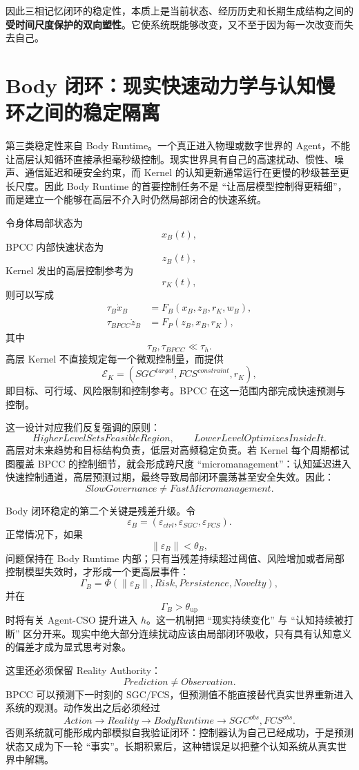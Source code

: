 因此三相记忆闭环的稳定性，本质上是当前状态、经历历史和长期生成结构之间的\textbf{受时间尺度保护的双向塑性}。它使系统既能够改变，又不至于因为每一次改变而失去自己。

\section{Body 闭环：现实快速动力学与认知慢环之间的稳定隔离}

第三类稳定性来自 Body Runtime。一个真正进入物理或数字世界的 Agent，不能让高层认知循环直接承担毫秒级控制。现实世界具有自己的高速扰动、惯性、噪声、通信延迟和硬安全约束，而 Kernel 的认知更新通常运行在更慢的秒级甚至更长尺度。因此 Body Runtime 的首要控制任务不是 ``让高层模型控制得更精细''，而是建立一个能够在高层不介入时仍然局部闭合的快速系统。

令身体局部状态为
\[
x_B(t),
\]
BPCC 内部快速状态为
\[
z_B(t),
\]
Kernel 发出的高层控制参考为
\[
r_K(t),
\]
则可以写成
\[
\begin{aligned}
\tau_B\dot x_B
&=
F_B(x_B,z_B,r_K,w_B),\\
\tau_{BPCC}\dot z_B
&=
F_P(z_B,x_B,r_K),
\end{aligned}
\]
其中
\[
\tau_B,\tau_{BPCC}
\ll
\tau_h.
\]
高层 Kernel 不直接规定每一个微观控制量，而提供
\[
\mathcal E_K
=
\left(
SGC^{target},
FCS^{constraint},
r_K
\right),
\]
即目标、可行域、风险限制和控制参考。BPCC 在这一范围内部完成快速预测与控制。

这一设计对应我们反复强调的原则：
\[
\boxed{
HigherLevelSetsFeasibleRegion,
\qquad
LowerLevelOptimizesInsideIt.
}
\]
高层对未来趋势和目标结构负责，低层对高频稳定负责。若 Kernel 每个周期都试图覆盖 BPCC 的控制细节，就会形成跨尺度 ``micromanagement''：认知延迟进入快速控制通道，高层预测过期，最终导致局部闭环震荡甚至安全失效。因此：
\[
\boxed{
SlowGovernance\neq FastMicromanagement.
}
\]

Body 闭环稳定的第二个关键是残差升级。令
\[
\varepsilon_B
=
\left(
\varepsilon_{ctrl},
\varepsilon_{SGC},
\varepsilon_{FCS}
\right).
\]
正常情况下，如果
\[
\|\varepsilon_B\|<\theta_B,
\]
问题保持在 Body Runtime 内部；只有当残差持续超过阈值、风险增加或者局部控制模型失效时，才形成一个更高层事件：
\[
\Gamma_B
=
\Phi
\left(
\|\varepsilon_B\|,
Risk,
Persistence,
Novelty
\right),
\]
并在
\[
\Gamma_B>\theta_{\mathrm{up}}
\]
时将有关 Agent-CSO 提升进入 $h$。这一机制把 ``现实持续变化'' 与 ``认知持续被打断'' 区分开来。现实中绝大部分连续扰动应该由局部闭环吸收，只有具有认知意义的偏差才成为显式思考对象。

这里还必须保留 Reality Authority：
\[
\boxed{
Prediction\neq Observation.
}
\]
BPCC 可以预测下一时刻的 SGC/FCS，但预测值不能直接替代真实世界重新进入系统的观测。动作发出之后必须经过
\[
Action
\rightarrow
Reality
\rightarrow
BodyRuntime
\rightarrow
SGC^{obs},FCS^{obs}.
\]
否则系统就可能形成内部模拟自我验证闭环：控制器认为自己已经成功，于是预测状态又成为下一轮 ``事实''。长期积累后，这种错误足以把整个认知系统从真实世界中解耦。

